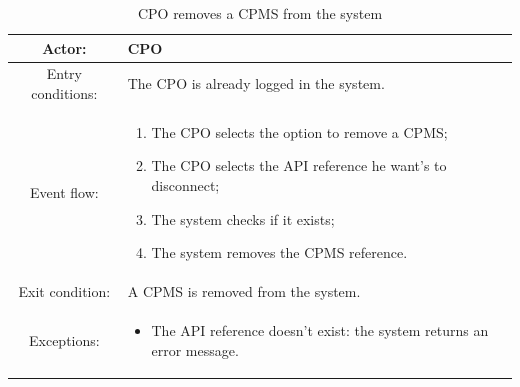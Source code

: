 \begin{table}[h]
    \begin{center}
        \begin{tabular}{|c||p{10cm}|}
            \hline
            Actor:            & \ac{CPO}                                      \\
            \hline
            Entry conditions: & The \ac{CPO} is already logged in the system. \\
            \hline
            Event flow:       &
            \begin{enumerate}
                \item The \ac{CPO} selects the option to remove a \ac{CPMS};
                \item The \ac{CPO} selects the \ac{API} reference he want's to disconnect;
                \item The system checks if it exists;
                \item The system removes the \ac{CPMS} reference.
            \end{enumerate}
            \\
            \hline
            Exit condition:   & A \ac{CPMS} is removed from the system.       \\
            \hline
            Exceptions:       &
            \begin{itemize}
                \item The API reference doesn't exist: the system returns an error message.
            \end{itemize}
            \\
            \hline
        \end{tabular}
    \end{center}
    \caption{\ac{CPO} removes a \ac{CPMS} from the system}
\end{table}

